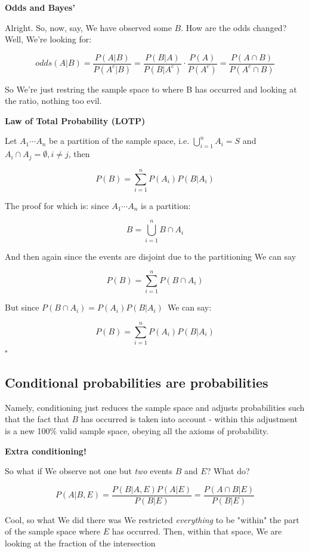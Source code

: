 \documentclass{article}
\newcommand{\qed}{\hfill$\square$}
\begin{document}
		\hfill
				
		\textbf{Odds and Bayes'}
			
			Alright. So, now, say, We have observed some $B$. How are the odds changed? Well, We're looking for:
				
			$$odds(A\vert B) = \frac{P(A\vert B)}{P(A^c\vert B)} = \frac{P(B\vert A)}{P(B\vert A^c)}\cdot \frac{P(A)}{P(A^c)} = \frac{P(A\cap B)}{P(A^c\cap B)}$$
				
			So We're just restring the sample space to where B has occurred and looking at the ratio, nothing too evil.
				
			\hfill
			
		\textbf{Law of Total Probability (LOTP)}
			
			Let $A_1\cdots A_n$ be a partition of the sample space, i.e. $\bigcup^n_{i=1} A_i = S$ and $A_i \cap A_j = \emptyset, i \neq j$, then
				
			$$P(B) = \sum^n_{i=1} P(A_i)P(B\vert A_i)$$	
				
			The proof for which is: since $A_1\cdots A_n$ is a partition:
				
			$$B = \bigcup^n_{i=1} B \cap A_i$$
				
			And then again since the events are disjoint due to the partitioning We can say
				
			$$P(B)= \sum^n_{i=1} P(B \cap A_i)$$
				
			But since $P(B \cap A_i) = P(A_i)P(B\vert A_i)$\ We can say:
				
			$$P(B)= \sum^n_{i=1} P(A_i)P(B\vert A_i)$$ \qed
			
	\subsection{Conditional probabilities are probabilities}
	
		Namely, conditioning just reduces the sample space and adjusts probabilities such that the fact that $B$ has occurred is taken into account - within this adjustment is a new 100\% valid sample space, obeying all the axioms of probability.
		
		\textbf{Extra conditioning!}
		
			So what if We observe not one but \textit{two} events $B$ and $E$? What do?
			
			$$P(A\vert B, E) = \frac{P(B\vert A, E)P(A\vert E)}{P(B\vert E)} = \frac{P(A\cap B\vert E)}{P(B\vert E)}$$
			
			Cool, so what We did there was We restricted \textit{everything} to be "within" the part of the sample space where $E$ has occurred. Then, within that space, We are looking at the fraction of the intersection 
			
\end{document}
